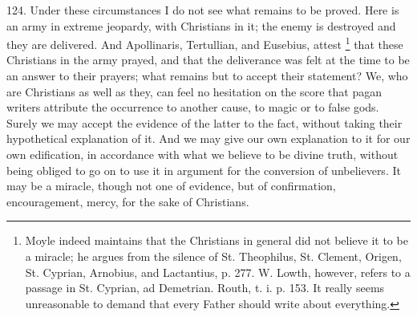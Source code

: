 124.
Under these circumstances I do not see what remains to be proved. Here
is an army in extreme jeopardy, with Christians in it; the enemy is
destroyed and they are delivered. And Apollinaris, Tertullian, and
Eusebius, attest \footnote{Moyle indeed maintains that the Christians in general did not believe
it to be a miracle; he argues from the silence of St. Theophilus, St.
Clement, Origen, St. Cyprian, Arnobius, and Lactantius, p. 277. W.
Lowth, however, refers to a passage in St. Cyprian, ad Demetrian.
Routh, t. i. p. 153. It really seems unreasonable to demand that every
Father should write about everything.} that
these Christians in the army prayed, and that the deliverance
was felt at the time to be an answer to their prayers; what remains
but to accept their statement? We, who are Christians as well as they,
can feel no hesitation on the score that pagan writers attribute the
occurrence to another cause, to magic or to false gods. Surely we may
accept the evidence of the latter to the fact, without taking their
hypothetical explanation of it. And we may give our own explanation to
it for our own edification, in accordance with what we believe to be
divine truth, without being obliged to go on to use it in argument for
the conversion of unbelievers. It may be a miracle, though not one of
evidence, but of confirmation, encouragement, mercy, for the sake of
Christians.

